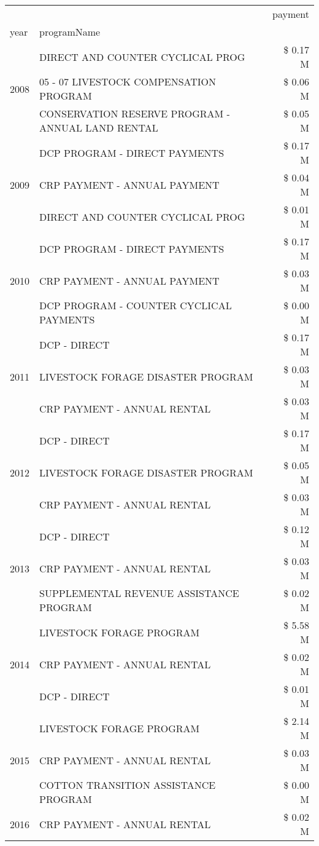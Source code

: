 \begin{tabular}{llr}
\toprule
 &  & payment \\
year & programName &  \\
\midrule
\multirow[t]{3}{*}{2008} & DIRECT AND COUNTER CYCLICAL PROG & \$ 0.17 M \\
 & 05 - 07 LIVESTOCK COMPENSATION PROGRAM & \$ 0.06 M \\
 & CONSERVATION RESERVE PROGRAM - ANNUAL LAND RENTAL & \$ 0.05 M \\
\cline{1-3}
\multirow[t]{3}{*}{2009} & DCP PROGRAM - DIRECT PAYMENTS & \$ 0.17 M \\
 & CRP PAYMENT - ANNUAL PAYMENT & \$ 0.04 M \\
 & DIRECT AND COUNTER CYCLICAL PROG & \$ 0.01 M \\
\cline{1-3}
\multirow[t]{3}{*}{2010} & DCP PROGRAM - DIRECT PAYMENTS & \$ 0.17 M \\
 & CRP PAYMENT - ANNUAL PAYMENT & \$ 0.03 M \\
 & DCP PROGRAM - COUNTER CYCLICAL PAYMENTS & \$ 0.00 M \\
\cline{1-3}
\multirow[t]{3}{*}{2011} & DCP - DIRECT & \$ 0.17 M \\
 & LIVESTOCK FORAGE DISASTER PROGRAM & \$ 0.03 M \\
 & CRP PAYMENT - ANNUAL RENTAL & \$ 0.03 M \\
\cline{1-3}
\multirow[t]{3}{*}{2012} & DCP - DIRECT & \$ 0.17 M \\
 & LIVESTOCK FORAGE DISASTER PROGRAM & \$ 0.05 M \\
 & CRP PAYMENT - ANNUAL RENTAL & \$ 0.03 M \\
\cline{1-3}
\multirow[t]{3}{*}{2013} & DCP - DIRECT & \$ 0.12 M \\
 & CRP PAYMENT - ANNUAL RENTAL & \$ 0.03 M \\
 & SUPPLEMENTAL REVENUE ASSISTANCE PROGRAM & \$ 0.02 M \\
\cline{1-3}
\multirow[t]{3}{*}{2014} & LIVESTOCK FORAGE PROGRAM & \$ 5.58 M \\
 & CRP PAYMENT - ANNUAL RENTAL & \$ 0.02 M \\
 & DCP - DIRECT & \$ 0.01 M \\
\cline{1-3}
\multirow[t]{3}{*}{2015} & LIVESTOCK FORAGE PROGRAM & \$ 2.14 M \\
 & CRP PAYMENT - ANNUAL RENTAL & \$ 0.03 M \\
 & COTTON TRANSITION ASSISTANCE PROGRAM & \$ 0.00 M \\
\cline{1-3}
\multirow[t]{3}{*}{2016} & CRP PAYMENT - ANNUAL RENTAL & \$ 0.02 M \\

\end{tabular}

